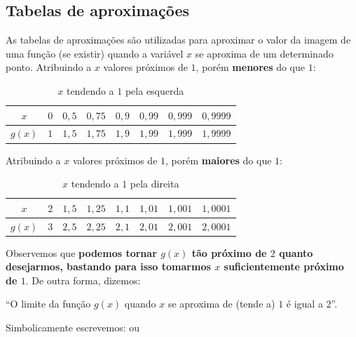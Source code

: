 \cleardoublepage\documentclass[../main.tex]{subfiles}
\begin{document}
\subsection{Tabelas de aproximações}
As tabelas de aproximações são utilizadas para aproximar o valor da imagem de uma
função (se existir) quando a variável $x$ se aproxima de um determinado ponto.
Atribuindo a $x$ valores próximos de $1$, porém \textbf{menores} do que $1$:
\begin{table}[H]
\centering
\begin{tabular}{|c|c|c|c|c|c|c|c|}
\hline
      $x$ & $0$&$ 0,5 $&$0,75 $&$0,9$&$ 0,99$&$ 0,999$&$ 0,9999$\\\hline
      $g(x)$ & $1$& $1,5 $&$1,75 $&$1,9 $&$1,99 $&$1,999 $&$1,9999$\\\hline
    \end{tabular}
    \caption{$x$ tendendo a $1$ pela esquerda}
    \label{tab:xTendendo1Esq}
\end{table}
Atribuindo a $x$ valores próximos de $1$, porém \textbf{maiores} do que $1$:
\begin{table}[H]
\centering
\begin{tabular}{|c|c|c|c|c|c|c|c|}
\hline
      $x$ & $2$&$ 1,5 $&$1,25 $&$1,1$&$ 1,01$&$1,001$&$1,0001$\\\hline
      $g(x)$ & $3$& $2,5 $&$2,25 $&$2,1$&$2,01$&$2,001 $&$2,0001$\\\hline
    \end{tabular}
     \caption{$x$ tendendo a $1$ pela direita}
    \label{tab:xTendendo1Dir}
\end{table}
    Observemos que \textbf{podemos tornar $g(x)$ tão próximo de $2$ quanto desejarmos, bastando
para isso tomarmos $x$ suficientemente próximo de $1$}. De outra forma, dizemos:
\begin{framed}
“O limite da função $g(x)$ quando $x$ se aproxima de (tende a) $1$ é igual a $2$”.
\end{framed}

Simbolicamente escrevemos:  ou 
\end{document}
